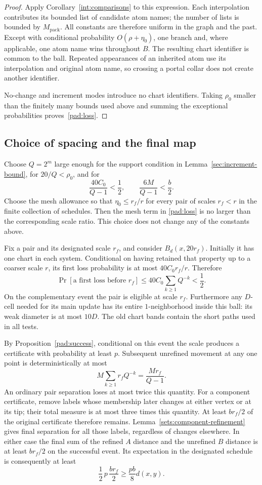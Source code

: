 \begin{proof}
Apply Corollary~\ref{int:comparisons} to this expression. Each
interpolation contributes its bounded list of candidate atom names;
the number of lists is bounded by $M_{\mathrm{pack}}$. All constants
are therefore uniform in the graph and the past. Except with
conditional probability $O(\rho+\eta_0)$, one branch and, where
applicable, one atom name wins throughout $B$. The resulting chart
identifier is common to the ball. Repeated appearances of an inherited
atom use its interpolation and original atom name, so crossing a
portal collar does not create another identifier.

No-change and increment modes introduce no chart identifiers. Taking
$\rho_0$ smaller than the finitely many bounds used above and summing
the exceptional probabilities proves~\eqref{pad:loss}.
\end{proof}

\subsection{Choice of spacing and the final map}
Choose $Q=2^m$ large enough for the support condition in
Lemma~\ref{sec:increment-bound}, for $20/Q<\rho_0$, and for
\begin{equation}\label{pad:spacing}
 \frac{40C_0}{Q-1}<\frac12,
 \qquad \frac{6M}{Q-1}<\frac b2.
\end{equation}
Choose the mesh allowance so that $\eta_0\le r_f/r$ for every
pair of scales $r_f<r$ in the finite collection of schedules. Then the
mesh term in \eqref{pad:loss} is no larger than the corresponding scale
ratio. This choice does not change any of the constants above.

Fix a pair and its designated scale $r_f$, and consider
$B_d(x,20r_f)$. Initially it has one chart in each system. Conditional
on having retained that property up to a coarser scale $r$, its first
loss probability is at most $40C_0 r_f/r$. Therefore
\[
 \Pr[\text{a first loss before }r_f]
 \le40C_0\sum_{k\ge1}Q^{-k}<\frac12.
\]
On the complementary event the pair is eligible at scale $r_f$.
Furthermore any $D$-cell needed for its main update has its entire
$1$-neighborhood inside this ball: its weak diameter is at most $10D$.
The old chart bands contain the short paths used in all tests.

By Proposition~\ref{pad:success}, conditional on this event the scale
produces a certificate with probability at least $p$. Subsequent
unrefined movement at any one point is deterministically at most
\[
 M\sum_{k\ge1}r_fQ^{-k}=\frac{Mr_f}{Q-1}.
\]
An ordinary pair separation loses at most twice this quantity. For a
component certificate, remove labels whose membership later changes
at either vertex or at its tip; their total measure is at most three
times this quantity. At least $br_f/2$ of the original certificate
therefore remains. Lemma~\ref{sets:component-refinement} gives final
separation for all those labels, regardless of changes elsewhere.
In either case the final sum of the refined $A$ distance and the
unrefined $B$ distance is at least $br_f/2$ on the successful event.
Its expectation in the designated schedule is consequently at least
\[
 \frac12\,p\,\frac{br_f}{2}
 \ge\frac{pb}{8}d(x,y).
\]

